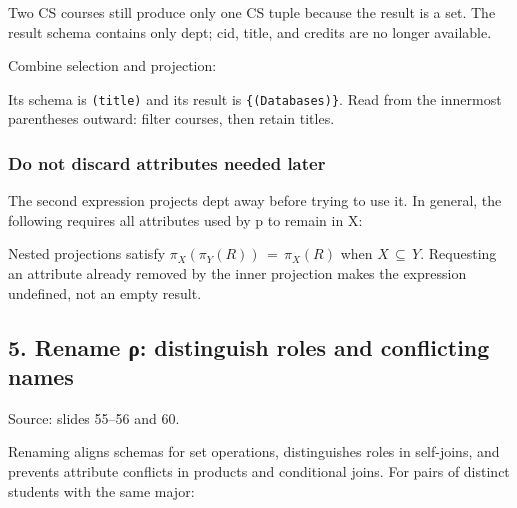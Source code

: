 Two CS courses still produce only one CS tuple because the result is a set. The result schema contains only dept; cid, title, and credits are no longer available.

Combine selection and projection:


Its schema is \texttt{(\allowbreak{}title)\allowbreak{}} and its result is \texttt{\{(Databases)\}}. Read from the innermost parentheses outward: filter courses, then retain titles.

\subsubsection{Do not discard attributes needed later}\label{05_relational_algebra_en-do-not-discard-attributes-needed-later}


The second expression projects dept away before trying to use it. In general, the following requires all attributes used by p to remain in X:


Nested projections satisfy \(\pi _{X}(\pi _{Y}(R))\,=\,\pi _{X}(R)\) when \(X\,\subseteq \,Y\). Requesting an attribute already removed by the inner projection makes the expression undefined, not an empty result.

\subsection{5. Rename ρ: distinguish roles and conflicting names}\label{05_relational_algebra_en-rename-ux3c1-distinguish-roles-and-conflicting-names}

Source: slides 55--56 and 60.

Renaming aligns schemas for set operations, distinguishes roles in self-joins, and prevents attribute conflicts in products and conditional joins. For pairs of distinct students with the same major:


